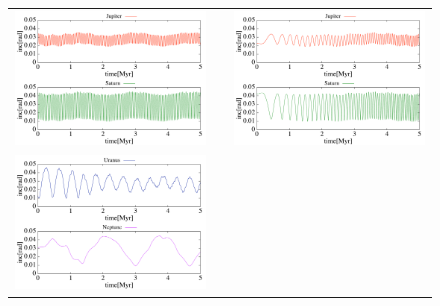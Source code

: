 \documentclass[11pt,a4paper,oneside,onecolumn]{jreport}
\begin{document}
\begin{figure}[H]
\begin{tabular}{ccc}
\begin{minipage}[t]{0.45\hsize}
\centering
\includegraphics[width=8cm]{./image/NoMove_inc_5Myr_JUPSAT.pdf}
\end{minipage} &
\begin{minipage}[t]{0.1\hsize}
\end{minipage} &
\begin{minipage}[t]{0.45\hsize}
\centering
\includegraphics[width=8cm]{./image/Move500kyr_inc_5Myr_JUPSAT.pdf}
\end{minipage}\\
\begin{minipage}[t]{0.45\hsize}
\centering
\includegraphics[width=8cm]{./image/NoMove_inc_5Myr_URANEP.pdf}
\end{minipage} &

\end{tabular}
\end{figure}
\end{document}
